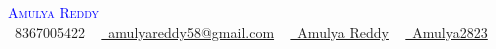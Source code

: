 \documentclass[letterpaper,11pt]{article}
\newcommand{\resumeSubHeadingListStart}{\begin{itemize}[leftmargin=0.0in, label={}]}
\newcommand{\resumeSubHeadingListEnd}{\end{itemize}}
\begin{document}

\begin{center}
    {\Huge \scshape \textcolor{blue}{ Amulya Reddy}} \\ \vspace{5pt}
    \small \raisebox{-0.1\height}\faPhone\ 8367005422 ~ \href{mailto:amulyareddy58@gmail.com}{\raisebox{-0.2\height}\faEnvelope\  amulyareddy58@gmail.com} ~ 
    \href{https://www.linkedin.com/in/amulya-reddy23/}{\raisebox{-0.2\height}\faLinkedin\ Amulya Reddy}  ~
    \href{https://github.com/Amulya2823}{\raisebox{-0.2\height}\faGithub\ Amulya2823   }
    \vspace{-8pt}
\end{center}\vspace{+10pt}


\end{document}
